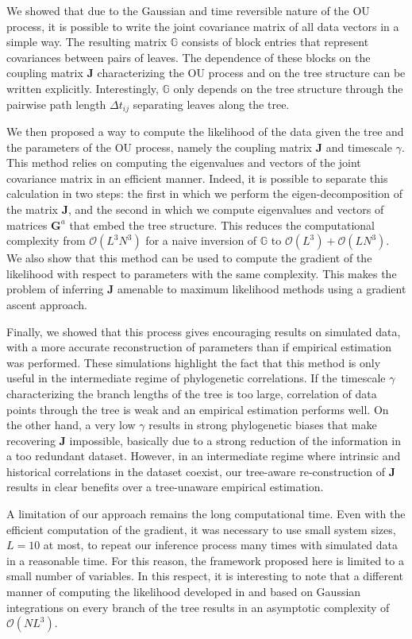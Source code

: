 \documentclass[preprint,amsmath,amssymb,superscriptaddress,showpacs,pre]{revtex4-1}
\begin{document}
We showed that due to the Gaussian and time reversible nature of the OU process, it is possible to write the joint covariance matrix of all data vectors in a simple way. 
The resulting matrix $\mathbb{G}$ consists of block entries that represent covariances between pairs of leaves.
The dependence of these blocks on the coupling matrix $\bm{J}$ characterizing the OU process and on the tree structure can be written explicitly. 
Interestingly, $\mathbb{G}$ only depends on the tree structure through the pairwise path length $\Delta t_{ij}$ separating leaves along the tree.

We then proposed a way to compute the likelihood of the data given the tree and the parameters of the OU process, namely the coupling matrix $\mathbf{J}$ and timescale $\gamma$.
This method relies on computing the eigenvalues and vectors of the joint covariance matrix in an efficient manner. 
Indeed, it is possible to separate this calculation in two steps: the first in which we perform the eigen-decomposition of the matrix $\mathbf{J}$, and the second in which we compute eigenvalues and vectors of matrices $\mathbf{G}^a$ that embed the tree structure. 
This reduces the computational complexity from $\mathcal{O}(L^3N^3)$ for a naive inversion of $\mathbb{G}$ to $\mathcal{O}(L^3) + \mathcal{O}(LN^3)$. 
We also show that this method can be used to compute the gradient of the likelihood with respect to parameters with the same complexity.
This makes the problem of inferring $\mathbf{J}$ amenable to maximum likelihood methods using a gradient ascent approach. 

Finally, we showed that this process gives encouraging results on simulated data, with a more accurate reconstruction of parameters than if empirical estimation was performed. 
These simulations highlight the fact that this method is only useful in the intermediate regime of phylogenetic correlations. 
If the timescale $\gamma$ characterizing the branch lengths of the tree is too large, correlation of data points through the tree is weak and an empirical estimation performs well. 
On the other hand, a very low $\gamma$ results in strong phylogenetic biases that make recovering $\mathbf{J}$ impossible, basically due to a strong reduction of the information in a too redundant dataset. However, in an intermediate regime where intrinsic and historical correlations in the dataset coexist, our tree-aware re-construction of $\mathbf{J}$ results in clear benefits over a tree-unaware empirical estimation. 

A limitation of our approach remains the long computational time. 
Even with the efficient computation of the gradient, it was necessary to use small system sizes, $L=10$ at most, to repeat our inference process many times with simulated data in a reasonable time. 
For this reason, the framework proposed here is limited to a small number of variables. 
In this respect, it is interesting to note that a different manner of computing the likelihood developed in \cite{mitov_fast_2020} and based on Gaussian integrations on every branch of the tree results in an asymptotic complexity of $\mathcal{O}(NL^3)$. 
\end{document}
